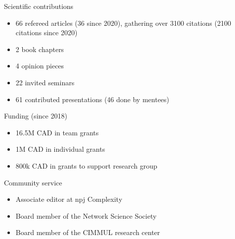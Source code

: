 \documentclass[10pt]{article}
\begin{document}
\vspace*{0.25\baselineskip}
\begin{minipage}[t]{0.56\textwidth}
  {\large\color{monbleu}Scientific contributions}
  \begin{itemize}
    \item 66 refereed articles (36 since 2020), gathering over 3100 citations (2100 citations since 2020)
    \item 2 book chapters
    \item 4 opinion pieces
    \item 22 invited seminars
    \item 61 contributed presentations (46 done by mentees)
  \end{itemize}
\end{minipage}
\hfill
\begin{minipage}[t]{0.42\textwidth}
  {\large\color{monbleu}Funding (since 2018)}
  \begin{itemize}
    \item 16.5M CAD in team grants
    \item 1M CAD in individual grants
    \item 800k CAD in grants to support research group
  \end{itemize}
  {\large\color{monbleu}Community service}
  \begin{itemize}
    \item Associate editor at npj Complexity
    \item Board member of the Network Science Society
    \item Board member of the CIMMUL research center
  \end{itemize}
\end{minipage}
\end{document}
